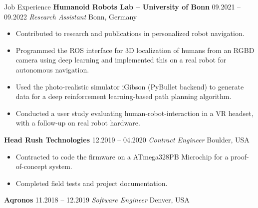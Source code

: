 \begin{rubric}{Job Experience}
%
%
\entry*[] \textbf{Humanoid Robots Lab -- University of Bonn} \hfill 09.2021 -- 09.2022 \newline
 \textit{Research Assistant} \hfill Bonn, Germany \newline 
\vspace{\CVItemizeHeaderSpacing} \begin{itemize}[leftmargin=*, rightmargin=1cm]
	\setlength{\itemsep}{\CVItemizeSpacing}
	\item Contributed to research and publications in personalized robot navigation.
	\item Programmed the ROS interface for 3D localization of humans from an RGBD camera using deep learning and implemented this on a real robot for autonomous navigation.
	\item Used the photo-realistic simulator iGibson (PyBullet backend) to generate data for a deep reinforcement learning-based path planning algorithm. 
	\item Conducted a user study evaluating human-robot-interaction in a VR headset, with a follow-up on real robot hardware.
\end{itemize}
%
%
\entry*[] \textbf{Head Rush Technologies} \hfill 12.2019 -- 04.2020 \newline
 \textit{Contract Engineer} \hfill Boulder, USA \newline 
\vspace{\CVItemizeHeaderSpacing} \begin{itemize}[leftmargin=*, rightmargin=1cm]
	\setlength{\itemsep}{\CVItemizeSpacing}
	\item Contracted to code the firmware on a ATmega328PB Microchip for a proof-of-concept system.  
	\item Completed field tests and project documentation.  
\end{itemize}
%
\entry*[] \textbf{Aqronos} \hfill 11.2018 -- 12.2019 \newline
\textit{Software Engineer} \hfill Denver, USA \newline
\vspace{\CVItemizeHeaderSpacing} \begin{itemize}[leftmargin=*, rightmargin=1cm]
	\setlength{\itemsep}{\CVItemizeSpacing}

\end{itemize}
\end{rubric}

